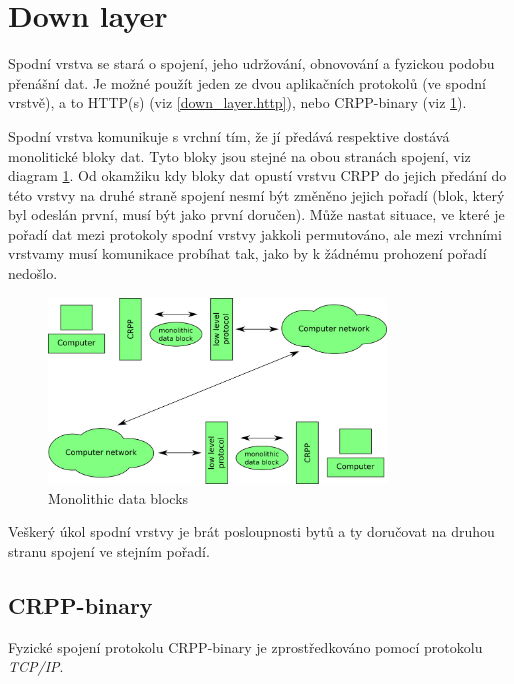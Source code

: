 \part{Down layer}
\label{down_layer}

Spodní vrstva se stará o spojení, jeho udržování, obnovování a fyzickou podobu přenášní dat. Je možné použít jeden ze dvou aplikačních protokolů (ve spodní vrstvě), a to HTTP(s) (viz \ref{down_layer.http}), nebo CRPP-binary (viz \ref{down_layer.crpp-binary}).

Spodní vrstva komunikuje s vrchní tím, že jí předává respektive dostává monolitické bloky dat. Tyto bloky jsou stejné na obou stranách spojení, viz diagram \ref{down_layer.pictures.monolithic_data_blocks}. Od okamžiku kdy bloky dat opustí vrstvu CRPP do jejich předání do této vrstvy na druhé straně spojení nesmí být změněno jejich pořadí (blok, který byl odeslán první, musí být jako první doručen). Může nastat situace, ve které je pořadí dat mezi protokoly spodní vrstvy jakkoli permutováno, ale mezi vrchními vrstvamy musí komunikace probíhat tak, jako by k žádnému prohození pořadí nedošlo.

\begin{figure}[h]
  \centering
  \includegraphics[width=0.80\textwidth]{diagrams/monolithic_data_blocks.png}
  \caption{Monolithic data blocks}
  \label{down_layer.pictures.monolithic_data_blocks}
\end{figure}

Veškerý úkol spodní vrstvy je brát posloupnosti bytů a ty doručovat na druhou stranu spojení ve stejním pořadí.

\chapter{CRPP-binary}
\label{down_layer.crpp-binary}

Fyzické spojení protokolu CRPP-binary je zprostředkováno pomocí protokolu \emph{TCP/IP}.

